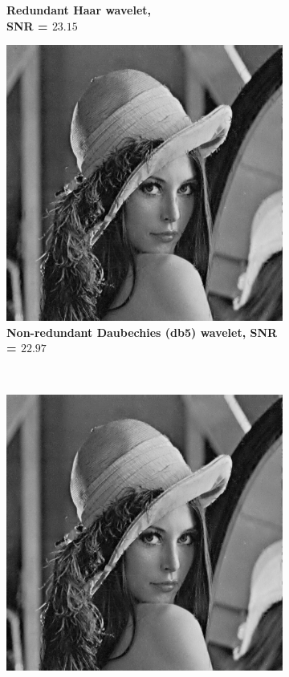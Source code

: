 \begin{figure}
\begin{subfigure}[b]{0.4\textwidth}
        \caption{\textbf{Redundant Haar wavelet, \\ SNR = $\mathbf{23.15}$} }
        \label{fig:matti_fig_rwt_haar}
    \end{subfigure}
    \begin{subfigure}[b]{0.4\textwidth}
        \includegraphics[width=\textwidth]{../src/inpainting/vraag_2_3_wt_db5}
        \caption{\textbf{Non-redundant Daubechies (db5) wavelet,  SNR = $\mathbf{22.97}$} }
        \label{fig:matti_fig_wt_db5}
    \end{subfigure}
    ~ %
    \begin{subfigure}[b]{0.4\textwidth}
        \includegraphics[width=\textwidth]{../src/inpainting/vraag_2_3_rwt_db5}

\end{subfigure}
\end{figure}

